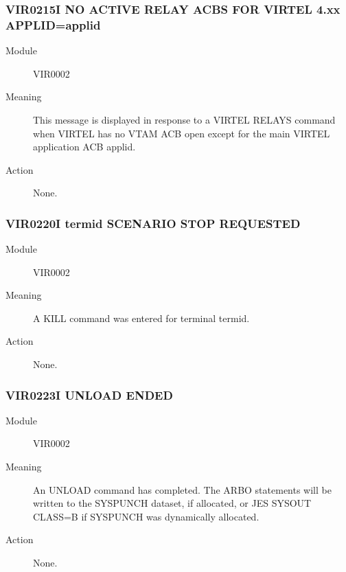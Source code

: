 \documentclass[letterpaper,10pt,english]{sphinxmanual}
\begin{document}
\subsubsection{VIR0215I NO ACTIVE RELAY ACBS FOR VIRTEL 4.xx APPLID=applid}
\label{\detokenize{messages:vir0215i-no-active-relay-acbs-for-virtel-4-xx-applid-applid}}\begin{description}
\item[{Module}] \leavevmode
VIR0002

\item[{Meaning}] \leavevmode
This message is displayed in response to a VIRTEL RELAYS command when VIRTEL has no VTAM ACB open except for the main VIRTEL application ACB applid.

\item[{Action}] \leavevmode
None.

\end{description}


\subsubsection{VIR0220I termid SCENARIO STOP REQUESTED}
\label{\detokenize{messages:vir0220i-termid-scenario-stop-requested}}\begin{description}
\item[{Module}] \leavevmode
VIR0002

\item[{Meaning}] \leavevmode
A KILL command was entered for terminal termid.

\item[{Action}] \leavevmode
None.

\end{description}


\subsubsection{VIR0223I UNLOAD ENDED}
\label{\detokenize{messages:vir0223i-unload-ended}}\begin{description}
\item[{Module}] \leavevmode
VIR0002

\item[{Meaning}] \leavevmode
An UNLOAD command has completed. The ARBO statements will be written to the SYSPUNCH dataset, if allocated, or JES SYSOUT CLASS=B if SYSPUNCH was dynamically allocated.

\item[{Action}] \leavevmode
None.

\end{description}
\end{document}
